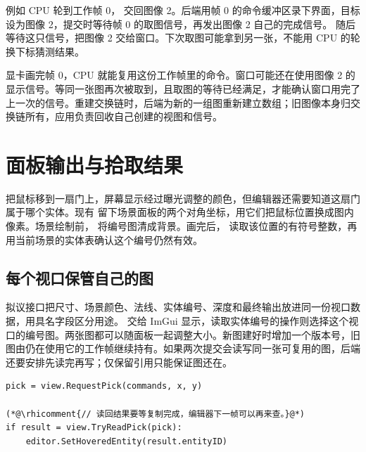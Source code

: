 
例如 CPU 轮到工作帧 0， 交回图像 2。后端用帧 0 的命令缓冲区录下界面，目标设为图像 2，提交时等待帧 0 的取图信号，再发出图像 2 自己的完成信号。 随后等待这只信号，把图像 2 交给窗口。下次取图可能拿到另一张，不能用 CPU 的轮换下标猜测结果。

显卡画完帧 0，CPU 就能复用这份工作帧里的命令。窗口可能还在使用图像 2 的显示信号。等同一张图再次被取到，且取图的等待已经满足，才能确认窗口用完了上一次的信号。重建交换链时，后端为新的一组图重新建立数组；旧图像本身归交换链所有，应用负责回收自己创建的视图和信号。


\clearpage
\section{面板输出与拾取结果}\label{sec:data-pick}
把鼠标移到一扇门上，屏幕显示经过曝光调整的颜色，但编辑器还需要知道这扇门属于哪个实体。现有  留下场景面板的两个对角坐标，用它们把鼠标位置换成图内像素。场景绘制前， 将编号图清成背景。画完后， 读取该位置的有符号整数，再用当前场景的实体表确认这个编号仍然有效。

\subsection{每个视口保管自己的图}
拟议接口把尺寸、场景颜色、法线、实体编号、深度和最终输出放进同一份视口数据，用具名字段区分用途。 交给 ImGui 显示，读取实体编号的操作则选择这个视口的编号图。两张图都可以随面板一起调整大小。新图建好时增加一个版本号，旧图由仍在使用它的工作帧继续持有。如果两次提交会读写同一张可复用的图，后端还要安排先读完再写；仅保留引用只能保证图还在。

\begin{lstlisting}
pick = view.RequestPick(commands, x, y)

(*@\rhicomment{// 读回结果要等复制完成，编辑器下一帧可以再来查。}@*)
if result = view.TryReadPick(pick):
    editor.SetHoveredEntity(result.entityID)
\end{lstlisting}

